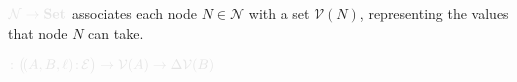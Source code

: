 \documentclass{article}
\newcommand{\notation}[2][]{#1}
\renewcommand{\notation}[2][]{{\color{notationcolor} #2}}
\newcommand{\bmu}{\boldsymbol{\mu}}
\newcommand{\V}{\mathcal V}
\newcommand{\N}{\mathcal N}
\newcommand{\Ed}{\mathcal E}
\newcommand{\MN}{PDG}
\numberwithin{equation}{section}
\begin{document}
\begin{defn}[\MN]
\begin{description}[nosep]
			\item[$\V$] $\notation{\N \to \mathbf{Set}}$ associates each node $N \in \N$ with a set $\V(N)$,
			 representing the values that node $N$ can take. 
			\item[$\mat p$] $\notation{\colon \big(\!({A,B,\ell})\colon \! \Ed \big) \to \V(A) \to \Delta\V(B)}$

\end{description}
\end{defn}
\end{document}
